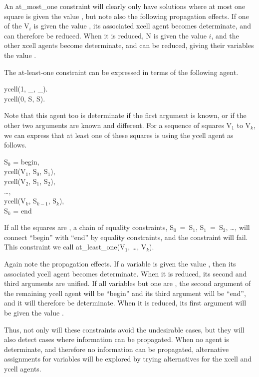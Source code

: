 An {\prog at_most_one constraint} will clearly only have solutions
where at most one square is given the value {}, but note also
the following propagation effects.  If one of the {\prog V$_i$} is
given the value {}, its associated {\prog xcell} agent becomes
determinate, and can therefore be reduced.  When it is reduced, {\prog
N} is given the value $i$, and the other xcell agents become
determinate, and can be reduced, giving their variables the value
{}.

The at-least-one constraint can be expressed in terms of the following
agent.
%
\begin{program}
ycell(1, _, _).  \\
ycell(0, S, S).
\end{program}%
%
Note that this agent too is determinate if the first argument is
known, or if the other two arguments are known and different.  For a
sequence of squares {\prog V$_1$} to {\prog V$_k$}, we can express that at
least one of these squares is {} using the {\prog ycell} agent
as follows.
%
\begin{progex}
S$_0$ = begin, \\
ycell(V$_1$, S$_0$, S$_1$), \\
ycell(V$_2$, S$_1$, S$_2$), \\
\dots, \\
ycell(V$_k$, S$_{k-1}$, S$_k$), \\
S$_k$ = end
\end{progex}%
%
If all the squares are {}, a chain of equality constraints,
{\prog S$_0$~=~S$_1$}, {\prog S$_1$~=~S$_2$,} \dots, will connect
``{\prog begin}'' with ``{\prog end}'' by equality constraints, and
the constraint will fail.  This constraint we call {\prog
at_least_one(V$_1$, \dots, V$_k$)}.

Again note the propagation effects.  If a variable is given the value
{}, then its associated {\prog ycell} agent becomes
determinate.  When it is reduced, its second and third arguments are
unified.  If all variables but one are {}, the second argument
of the remaining {\prog ycell} agent will be ``{\prog begin}'' and its
third argument will be ``{\prog end}'', and it will therefore be
determinate.  When it is reduced, its first argument will be given the
value {}.

Thus, not only will these constraints avoid the undesirable cases, but
they will also detect cases where information can be propagated.  When
no agent is determinate, and therefore no information can be
propagated, alternative assignments for variables will be explored by
trying alternatives for the {\prog xcell} and {\prog ycell} agents.

